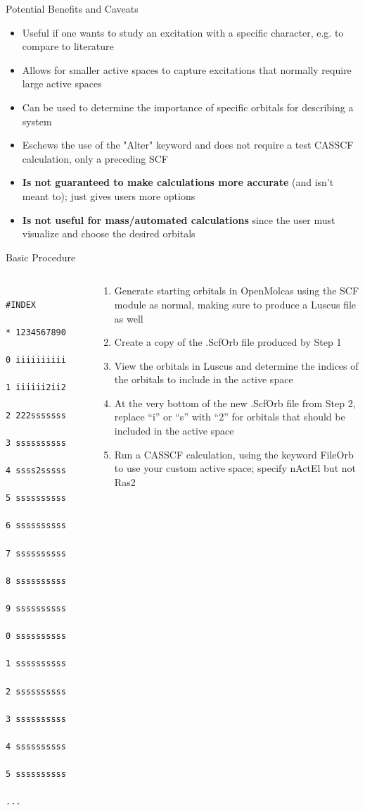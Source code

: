 \documentclass[12pt,aspectratio=169]{beamer}
\begin{document}
	\begin{frame}{Potential Benefits and Caveats}
		\begin{itemize}
			\item Useful if one wants to study an excitation with a specific character, e.g. to compare to literature
			\item Allows for smaller active spaces to capture excitations that normally require large active spaces
			\item Can be used to determine the importance of specific orbitals for describing a system
			\item Eschews the use of the "Alter" keyword and does not require a test CASSCF calculation, only a preceding SCF
			\item \textbf{Is not guaranteed to make calculations more accurate} (and isn't meant to); just gives users more options
			\item \textbf{Is not useful for mass/automated calculations} since the user must visualize and choose the desired orbitals
		\end{itemize}
	\end{frame}

	\begin{frame}[fragile]{Basic Procedure}
		\begin{columns}
			\begin{column}{.25\linewidth}
				\begin{scriptsize}
					\begin{verbatim}
						#INDEX
						* 1234567890
						0 iiiiiiiiii
						1 iiiiii2ii2
						2 222sssssss
						3 ssssssssss
						4 ssss2sssss
						5 ssssssssss
						6 ssssssssss
						7 ssssssssss
						8 ssssssssss
						9 ssssssssss
						0 ssssssssss
						1 ssssssssss
						2 ssssssssss
						3 ssssssssss
						4 ssssssssss
						5 ssssssssss
						...
					\end{verbatim}
				\end{scriptsize}
			\end{column}
			\begin{column}{.75\linewidth}
					\begin{enumerate}
					\item Generate starting orbitals in OpenMolcas using the SCF module as normal, making sure to produce a Luscus file as well
					\item Create a copy of the .ScfOrb file produced by Step 1
					\item View the orbitals in Luscus and determine the indices of the orbitals to include in the active space
					\item At the very bottom of the new .ScfOrb file from Step 2, replace ``i'' or ``s'' with ``2'' for orbitals that should be included in the active space
					\item Run a CASSCF calculation, using the keyword FileOrb to use your custom active space; specify nActEl but not Ras2
				\end{enumerate}
			\end{column}
		\end{columns}
	\end{frame}
\end{document}
